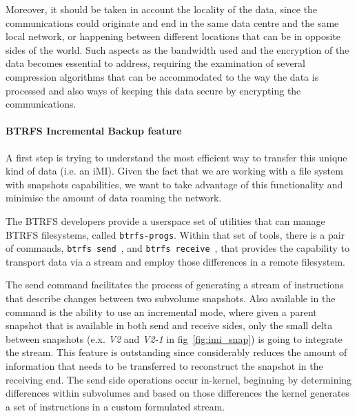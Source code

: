 Moreover, it should be taken in account the locality of the data, since the communications could originate and end in the same data centre and the same local network, or happening between different locations that can be in opposite sides of the world. Such aspects as the bandwidth used and the encryption of the data becomes essential to address, requiring the examination of several compression algorithms that can be accommodated to the way the data is processed and also ways of keeping this data secure by encrypting the communications.
\newpage



\paragraph{BTRFS Incremental Backup feature}
\label{par:incremental_btrfs}

A first step is trying to understand the most efficient way to transfer this unique kind of data (i.e. an iMI). Given the fact that we are working with a file system with snapshots capabilities, we want to take advantage of this functionality and minimise the amount of data roaming the network.

The BTRFS developers provide a userspace set of utilities that can manage BTRFS filesystems, called \texttt{btrfs-progs}. Within that set of tools, there is a pair of commands, \texttt{btrfs send}~\cite{btrfs_send}, and \texttt{btrfs receive}~\cite{btrfs_receive}, that provides the capability to transport data via a stream and employ those differences in a remote filesystem. 

The send command facilitates the process of generating a stream of instructions that describe changes between two subvolume snapshots. Also available in the command is the ability to use an incremental mode, where given a parent snapshot that is available in both send and receive sides, only the small delta between snapshots (e.x. \textit{V2} and \textit{V2-1} in fig~\ref{fig:imi_snap}) is going to integrate the stream. This feature is outstanding since considerably reduces the amount of information that needs to be transferred to reconstruct the snapshot in the receiving end. The send side operations occur in-kernel, beginning by determining differences within subvolumes and based on those differences the kernel generates a set of instructions in a custom formulated stream.

